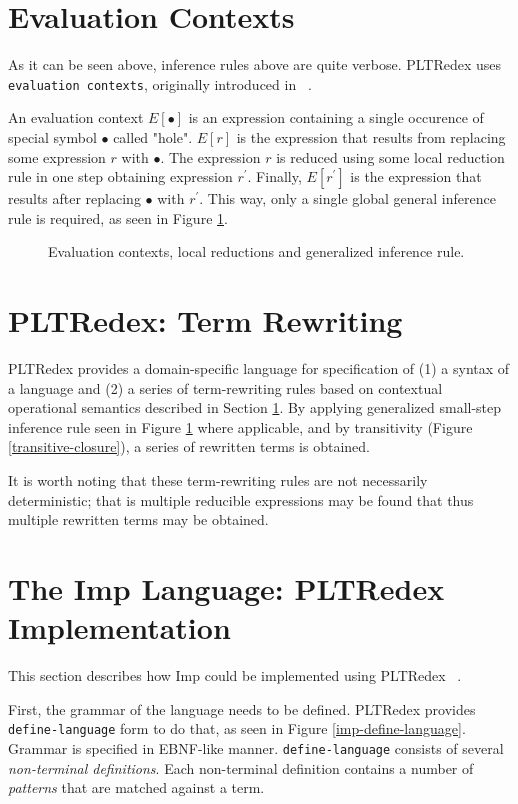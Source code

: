 \section{Evaluation Contexts}
\label{02-evaluation-context}
As it can be seen above, inference rules above are quite verbose. PLTRedex uses \texttt{evaluation contexts}, originally introduced in ~\cite{felleisen1992revised}.

An evaluation context $E[\bullet]$ is an expression containing a single occurence of special symbol $\bullet$ called "hole". $E[r]$ is the expression that results from replacing some expression $r$ with $\bullet$. The expression $r$ is reduced using some local reduction rule in one step obtaining expression $r^\prime$. Finally, $E[r^\prime]$ is the expression that results after replacing $\bullet$ with $r^\prime$. This way, only a single global general inference rule is required, as seen in Figure \ref{infer-evaluation}. 

\begin{figure}[!h]

\caption{Evaluation contexts, local reductions and generalized inference rule.}
\label{infer-evaluation}
\end{figure}

\section{PLTRedex: Term Rewriting}
PLTRedex provides a domain-specific language for specification of (1) a syntax of a language and (2) a series of term-rewriting rules based on contextual operational semantics described in Section \ref{02-evaluation-context}. By applying generalized small-step inference rule seen in Figure \ref{infer-evaluation} where applicable, and by transitivity (Figure \ref{transitive-closure}), a series of rewritten terms is obtained.

It is worth noting that these term-rewriting rules are not necessarily deterministic; that is multiple reducible expressions may be found that thus multiple rewritten terms may be obtained.

\section{The Imp Language: PLTRedex Implementation}
\label{02-pltredex}
This section describes how Imp could be implemented using PLTRedex ~\cite{redexreference}. 

First, the grammar of the language needs to be defined. PLTRedex provides \texttt{define-language} form to do that, as seen in Figure \ref{imp-define-language}. Grammar is specified in EBNF-like manner. \texttt{define-language} consists of several \textit{non-terminal definitions}. Each non-terminal definition contains a number of \textit{patterns} that are matched against a term. 

